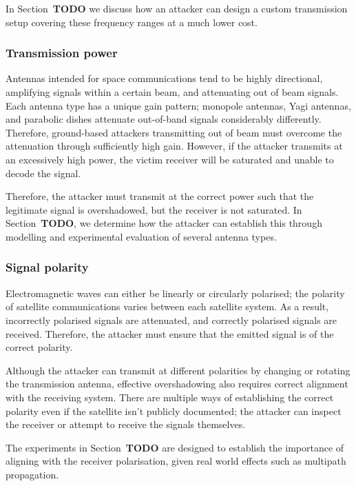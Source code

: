In Section~\textbf{TODO} we discuss how an attacker can design a custom transmission setup covering these frequency ranges at a much lower cost.

\subsubsection{Transmission power}

Antennas intended for space communications tend to be highly directional, amplifying signals within a certain beam, and attenuating out of beam signals.
Each antenna type has a unique gain pattern; monopole antennas, Yagi antennas, and parabolic dishes attenuate out-of-band signals considerably differently.
Therefore, ground-based attackers transmitting out of beam must overcome the attenuation through sufficiently high gain.
However, if the attacker transmits at an excessively high power, the victim receiver will be saturated and unable to decode the signal.

Therefore, the attacker must transmit at the correct power such that the legitimate signal is overshadowed, but the receiver is not saturated.
In Section~\textbf{TODO}, we determine how the attacker can establish this through modelling and experimental evaluation of several antenna types.


\subsubsection{Signal polarity}

Electromagnetic waves can either be linearly or circularly polarised; the polarity of satellite communications varies between each satellite system.
As a result, incorrectly polarised signals are attenuated, and correctly polarised signals are received.
Therefore, the attacker must ensure that the emitted signal is of the correct polarity.

Although the attacker can transmit at different polarities by changing or rotating the transmission antenna, effective overshadowing also requires correct alignment with the receiving system.
There are multiple ways of establishing the correct polarity even if the satellite isn't publicly documented; the attacker can inspect the receiver or attempt to receive the signals themselves.

The experiments in Section~\textbf{TODO} are designed to establish the importance of aligning with the receiver polarisation, given real world effects such as multipath propagation.


